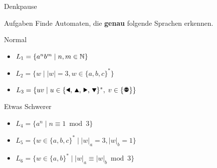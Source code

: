 \documentclass[10pt]{beamer}
\begin{document}
{
\begin{frame}{Denkpause}
    \begin{alertblock}{Aufgaben}
    Finde Automaten, die \textbf{genau} folgende Sprachen erkennen.
    \end{alertblock}
    \begin{block}{Normal}
    \begin{itemize}
        \item $L_1 = \{a^nb^m \mid n, m\in\mathbb{N}\}$
        \item $L_2 = \{w \mid |w| = 3, w\in \{a,b,c\}^*\}$
        \item $L_3 = \{uv \mid u\in\{\text{\Rewind, \MoveUp, \Forward, \MoveDown}\}^\ast,\;v\in\{\text{\Stopsign}\}\}$
    \end{itemize}
    \end{block}
    \begin{block}{Etwas Schwerer}
    \begin{itemize}
        \item $L_4 = \{a^n \mid n \equiv 1 \bmod 3\}$
        \item $L_5 = \{w \in \{a,b,c\}^* \mid |w|_a = 3, |w|_b = 1\}$
        \item $L_6=\{w \in \{a,b\}^* \mid |w|_a \equiv |w|_b \bmod 3\}$
    \end{itemize}
    \end{block}
\end{frame}
}
\end{document}
